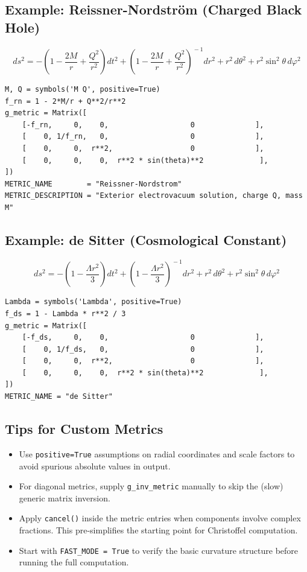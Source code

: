 \documentclass[11pt,a4paper]{article}
\newcommand{\code}[1]{\texttt{\small#1}}
\begin{document}
\subsection*{Example: Reissner-Nordström (Charged Black Hole)}

\[
  ds^2 = -\!\left(1 - \frac{2M}{r} + \frac{Q^2}{r^2}\right)dt^2
         + \left(1 - \frac{2M}{r} + \frac{Q^2}{r^2}\right)^{\!-1}dr^2
         + r^2\,d\theta^2 + r^2\sin^2\!\theta\,d\varphi^2
\]

\begin{lstlisting}
M, Q = symbols('M Q', positive=True)
f_rn = 1 - 2*M/r + Q**2/r**2
g_metric = Matrix([
    [-f_rn,     0,    0,                   0              ],
    [    0, 1/f_rn,   0,                   0              ],
    [    0,     0,  r**2,                  0              ],
    [    0,     0,    0,  r**2 * sin(theta)**2             ],
])
METRIC_NAME        = "Reissner-Nordstrom"
METRIC_DESCRIPTION = "Exterior electrovacuum solution, charge Q, mass M"
\end{lstlisting}

\subsection*{Example: de Sitter (Cosmological Constant)}

\[
  ds^2 = -\!\left(1 - \frac{\Lambda r^2}{3}\right)dt^2
         + \left(1 - \frac{\Lambda r^2}{3}\right)^{\!-1}dr^2
         + r^2\,d\theta^2 + r^2\sin^2\!\theta\,d\varphi^2
\]

\begin{lstlisting}
Lambda = symbols('Lambda', positive=True)
f_ds = 1 - Lambda * r**2 / 3
g_metric = Matrix([
    [-f_ds,     0,    0,                   0              ],
    [    0, 1/f_ds,   0,                   0              ],
    [    0,     0,  r**2,                  0              ],
    [    0,     0,    0,  r**2 * sin(theta)**2             ],
])
METRIC_NAME = "de Sitter"
\end{lstlisting}

\subsection*{Tips for Custom Metrics}

\begin{itemize}
  \item Use \code{positive=True} assumptions on radial coordinates and
        scale factors to avoid spurious absolute values in output.
  \item For diagonal metrics, supply \code{g\_inv\_metric} manually to
        skip the (slow) generic matrix inversion.
  \item Apply \code{cancel()} inside the metric entries when components
        involve complex fractions.  This pre-simplifies the starting point
        for Christoffel computation.
  \item Start with \code{FAST\_MODE = True} to verify the basic curvature
        structure before running the full computation.
\end{itemize}
\end{document}
